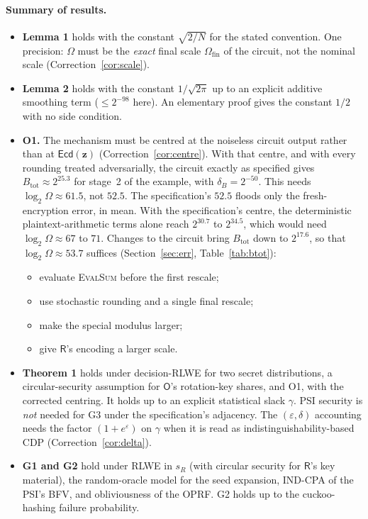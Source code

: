 \documentclass[11pt]{article}
\theoremstyle{definition}
\theoremstyle{plain}
\newcommand{\Rp}{\mathsf{R}}
\newcommand{\Op}{\mathsf{O}}
\newcommand{\Ecd}{\mathsf{Ecd}}
\newcommand{\Btot}{B_{\mathrm{tot}}}
\newcommand{\Omf}{\Omega_{\mathrm{fin}}}
\begin{document}
\paragraph{Summary of results.}
\begin{itemize}[nosep]
  \item \textbf{Lemma 1} holds with the constant $\sqrt{2/N}$ for the stated convention. One precision: $\Omega$ must be the \emph{exact} final scale $\Omf$ of the circuit, not the nominal scale (Correction~\ref{cor:scale}).
  \item \textbf{Lemma 2} holds with the constant $1/\sqrt{2\pi}$ up to an explicit additive smoothing term ($\le2^{-98}$ here). An elementary proof gives the constant $1/2$ with no side condition.
  \item \textbf{O1.} The mechanism must be centred at the noiseless circuit output rather than at $\Ecd(\mathbf z)$ (Correction~\ref{cor:centre}). With that centre, and with every rounding treated adversarially, the circuit exactly as specified gives $\Btot\approx2^{25.3}$ for stage~2 of the example, with $\delta_B=2^{-50}$. This needs $\log_2\Omega\approx61.5$, not $52.5$. The specification's $52.5$ floods only the fresh-encryption error, in mean. With the specification's centre, the deterministic plaintext-arithmetic terms alone reach $2^{30.7}$ to $2^{34.5}$, which would need $\log_2\Omega\approx67$ to $71$. Changes to the circuit bring $\Btot$ down to $2^{17.6}$, so that $\log_2\Omega\approx53.7$ suffices (Section~\ref{sec:err}, Table~\ref{tab:btot}):
    \begin{itemize}[nosep]
      \item evaluate \textsc{EvalSum} before the first rescale;
      \item use stochastic rounding and a single final rescale;
      \item make the special modulus larger;
      \item give $\Rp$'s encoding a larger scale.
    \end{itemize}
  \item \textbf{Theorem 1} holds under decision-RLWE for two secret distributions, a circular-security assumption for $\Op$'s rotation-key shares, and O1, with the corrected centring. It holds up to an explicit statistical slack $\gamma$. PSI security is \emph{not} needed for G3 under the specification's adjacency. The $(\varepsilon,\delta)$ accounting needs the factor $(1+e^{\varepsilon})$ on $\gamma$ when it is read as indistinguishability-based CDP (Correction~\ref{cor:delta}).
  \item \textbf{G1 and G2} hold under RLWE in $s_R$ (with circular security for $\Rp$'s key material), the random-oracle model for the seed expansion, IND-CPA of the PSI's BFV, and obliviousness of the OPRF. G2 holds up to the cuckoo-hashing failure probability.

\end{itemize}
\end{document}
